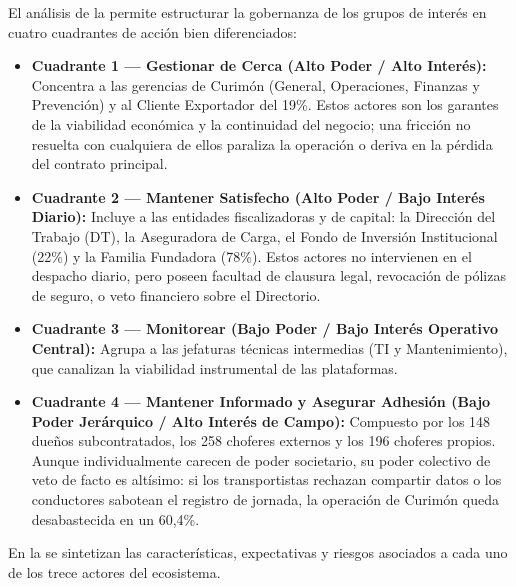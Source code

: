 El análisis de la  permite estructurar la gobernanza de los grupos de interés en cuatro cuadrantes de acción bien diferenciados:
\begin{itemize}
  \item \textbf{Cuadrante 1 — Gestionar de Cerca (Alto Poder / Alto Interés):} Concentra a las gerencias de Curimón (General, Operaciones, Finanzas y Prevención) y al Cliente Exportador del 19\%. Estos actores son los garantes de la viabilidad económica y la continuidad del negocio; una fricción no resuelta con cualquiera de ellos paraliza la operación o deriva en la pérdida del contrato principal.
  \item \textbf{Cuadrante 2 — Mantener Satisfecho (Alto Poder / Bajo Interés Diario):} Incluye a las entidades fiscalizadoras y de capital: la Dirección del Trabajo (DT), la Aseguradora de Carga, el Fondo de Inversión Institucional (22\%) y la Familia Fundadora (78\%). Estos actores no intervienen en el despacho diario, pero poseen facultad de clausura legal, revocación de pólizas de seguro, o veto financiero sobre el Directorio.
  \item \textbf{Cuadrante 3 — Monitorear (Bajo Poder / Bajo Interés Operativo Central):} Agrupa a las jefaturas técnicas intermedias (TI y Mantenimiento), que canalizan la viabilidad instrumental de las plataformas.
  \item \textbf{Cuadrante 4 — Mantener Informado y Asegurar Adhesión (Bajo Poder Jerárquico / Alto Interés de Campo):} Compuesto por los 148 dueños subcontratados, los 258 choferes externos y los 196 choferes propios. Aunque individualmente carecen de poder societario, su poder colectivo de veto de facto es altísimo: si los transportistas rechazan compartir datos o los conductores sabotean el registro de jornada, la operación de Curimón queda desabastecida en un 60,4\%.
\end{itemize}

En la  se sintetizan las características, expectativas y riesgos asociados a cada uno de los trece actores del ecosistema.

